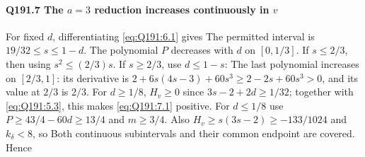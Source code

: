 \paragraph{Q191.7 The $a=\allowbreak 3$ reduction increases continuously in $v$}\label{part:Q191.7}
For fixed $d$, differentiating \eqref{eq:Q191:6.1} gives
The permitted interval is $19/32\le\allowbreak  s\le\allowbreak 1-d$. The polynomial $P$
decreases with $d$ on $[0,\allowbreak 1/3]$. If $s\le\allowbreak 2/3$, then
using $s^2\le\allowbreak (2/3)s$. If $s\ge\allowbreak 2/3$, use $d\le\allowbreak 1-s$:
The last polynomial increases on $[2/3,\allowbreak 1]$: its derivative is
$2+6s(4s-3)+60s^3\ge\allowbreak 2-2s+60s^3>\allowbreak 0$, and its value at $2/3$ is $2/3$.
For $d\ge\allowbreak 1/8$, $H_v\ge\allowbreak 0$ since $3s-2+2d\ge\allowbreak 1/32$; together with
\eqref{eq:Q191:5.3}, this makes \eqref{eq:Q191:7.1} positive.
For $d\le\allowbreak 1/8$ use $P\ge\allowbreak 43/4-60d\ge\allowbreak 13/4$ and $m\ge\allowbreak 3/4$.
Also $H_v\ge\allowbreak  s(3s-2)\ge\allowbreak -133/1024$ and $k_\delta<\allowbreak 8$, so
Both continuous subintervals and their common endpoint are covered. Hence

